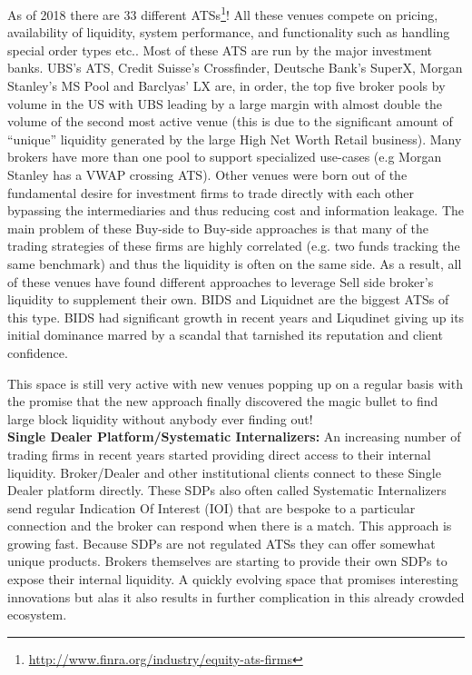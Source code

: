 As of 2018 there are 33 different ATSs\footnote{\url{http://www.finra.org/industry/equity-ats-firms}}!  All these venues compete on pricing, availability of liquidity, system performance, and functionality such as handling special order types etc.. Most of these ATS are run by the major investment banks. UBS's ATS, Credit Suisse's Crossfinder, Deutsche Bank's SuperX, Morgan Stanley's MS Pool and Barclyas' LX are, in order,  the top five broker pools by volume in the US with UBS leading by a large margin with almost double the volume of the second most active venue (this is due to the significant amount of ``unique'' liquidity generated by the large High Net Worth Retail business). Many brokers have more than one pool to support specialized use-cases (e.g Morgan Stanley has a VWAP crossing ATS). Other venues were born out of the fundamental desire for investment firms to trade directly with each other bypassing the intermediaries and  thus reducing cost and information leakage. The main problem of these Buy-side to Buy-side approaches is that many of the trading strategies of these firms are highly correlated (e.g. two funds tracking the same benchmark) and thus the liquidity is often  on the same side. As a result, all of these venues have found different approaches to leverage Sell side broker's liquidity to supplement their own. BIDS and Liquidnet  are the biggest ATSs of this type. BIDS had significant growth in recent years and Liqudinet giving up its initial dominance marred by a scandal that tarnished its reputation and client confidence.


This space is still very active with new venues popping up on a regular basis with the promise that the new approach finally discovered the magic bullet to find large block liquidity without anybody ever finding out! \\


\noindent\textbf{Single Dealer Platform/Systematic Internalizers:} An increasing number of trading firms in recent years started providing direct access to their internal liquidity. Broker/Dealer and other institutional clients connect to these Single Dealer platform directly. These SDPs also often called Systematic Internalizers send regular Indication Of Interest (IOI)  that are bespoke to a particular connection and the broker can respond when there is a match. This approach is growing fast. Because SDPs are not regulated ATSs they can offer somewhat unique products. Brokers themselves are starting to provide their own SDPs to expose their internal liquidity. A quickly evolving space that promises interesting innovations but alas it also results in further complication in this already crowded ecosystem. \\


